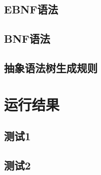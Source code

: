 \documentclass{article}
\begin{document}
\subsection{EBNF语法}  

\subsection{BNF语法}  

\subsection{抽象语法树生成规则}


\section{运行结果} 
\subsection{测试1} 


\subsection{测试2}


\end{document}
